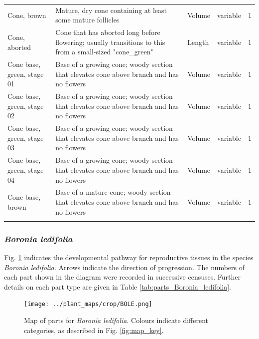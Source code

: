 \documentclass[10pt,twoside]{article}\usepackage[]{graphicx}\usepackage[]{color}
\begin{document}
\begin{longtable}{p{4.5cm}p{6cm}p{2cm}p{1cm}p{1cm}}
  Cone, brown & Mature, dry cone containing at least some mature follicles & Volume & variable &   1 \\ 
  Cone, aborted & Cone that has aborted long before flowering; usually transitions to this from a small-sized "cone\_green" & Length & variable &   1 \\ 
  Cone base, green, stage 01 & Base of a growing cone; woody section that elevates cone above branch and has no flowers & Volume & variable &   1 \\ 
  Cone base, green, stage 02 & Base of a growing cone; woody section that elevates cone above branch and has no flowers & Volume & variable &   1 \\ 
  Cone base, green, stage 03 & Base of a growing cone; woody section that elevates cone above branch and has no flowers & Volume & variable &   1 \\ 
  Cone base, green, stage 04 & Base of a growing cone; woody section that elevates cone above branch and has no flowers & Volume & variable &   1 \\ 
  Cone base, brown & Base of a mature cone; woody section that elevates cone above branch and has no flowers & Volume & variable &   1 \\ 
   \hline
\hline
\label{tab:parts_Banksia_ericifolia}
\end{longtable}
\endgroup



\clearpage

\subsubsection{\emph{Boronia ledifolia}}

Fig. \ref{fig:map_Boronia_ledifolia} indicates the developmental pathway for reproductive tissues in the species \emph{Boronia ledifolia}. Arrows indicate the direction of progression.  The numbers of each part shown in the diagram were recorded in successive censuses. Further details on each part type are given in Table \ref{tab:parts_Boronia_ledifolia}.


\begin{figure}[h]
\centering
\texttt{[image: ../plant\_maps/crop/BOLE.png]}
\caption{Map of parts for \emph{Boronia ledifolia}. Colours indicate different categories, as described in Fig. \ref{fig:map_key}.}
\label{fig:map_Boronia_ledifolia}
\end{figure}
\end{document}
